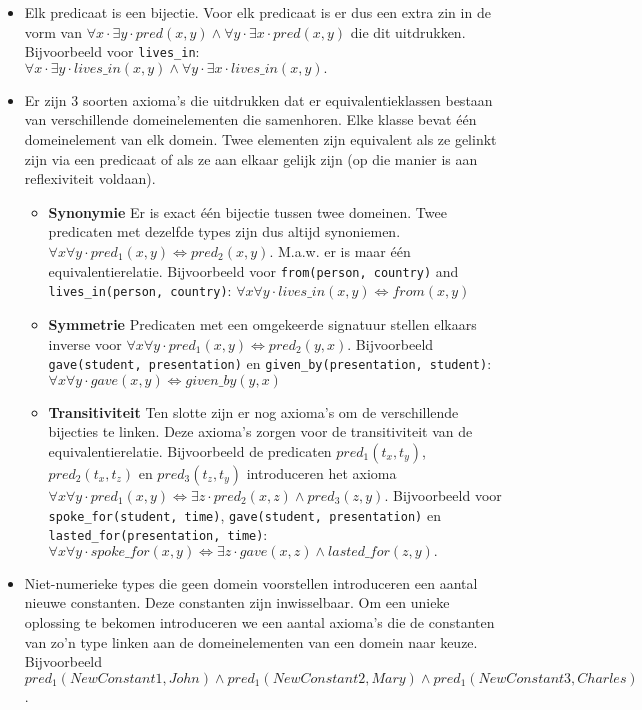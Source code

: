 \begin{itemize}
  \item Elk predicaat is een bijectie. Voor elk predicaat is er dus een extra zin in de vorm van $\forall x \cdot \exists y \cdot pred(x, y) \land \forall y \cdot \exists x \cdot pred(x, y)$ die dit uitdrukken. Bijvoorbeeld voor \texttt{lives\_in}: $\forall x \cdot \exists y \cdot lives\_in(x, y) \land \forall y \cdot \exists x \cdot lives\_in(x, y).$
  \item Er zijn 3 soorten axioma's die uitdrukken dat er equivalentieklassen bestaan van verschillende domeinelementen die samenhoren. Elke klasse bevat één domeinelement van elk domein. Twee elementen zijn equivalent als ze gelinkt zijn via een predicaat of als ze aan elkaar gelijk zijn (op die manier is aan reflexiviteit voldaan).
    \begin{itemize}
      \item \textbf{Synonymie} Er is exact één bijectie tussen twee domeinen. Twee predicaten met dezelfde types zijn dus altijd synoniemen. $\forall x \forall y \cdot pred_1(x, y) \Leftrightarrow pred_2(x, y)$. M.a.w. er is maar één equivalentierelatie. Bijvoorbeeld voor \texttt{from(person, country)} and \texttt{lives\_in(person, country)}: $\forall x \forall y \cdot lives\_in(x, y) \Leftrightarrow from(x, y)$
      \item \textbf{Symmetrie} Predicaten met een omgekeerde signatuur stellen elkaars inverse voor $\forall x \forall y \cdot pred_1(x, y) \Leftrightarrow pred_2(y, x)$. Bijvoorbeeld \texttt{gave(student, presentation)} en \texttt{given\_by(presentation, student)}: $\forall x \forall y \cdot gave(x, y) \Leftrightarrow given\_by(y, x)$
      \item \textbf{Transitiviteit} Ten slotte zijn er nog axioma's om de verschillende bijecties te linken. Deze axioma's zorgen voor de transitiviteit van de equivalentierelatie. Bijvoorbeeld de predicaten $pred_1(t_x, t_y)$, $pred_2(t_x, t_z)$ en $pred_3(t_z, t_y)$ introduceren het axioma $\forall x \forall y \cdot pred_1(x, y) \Leftrightarrow \exists z \cdot pred_2(x, z) \land pred_3(z, y)$. Bijvoorbeeld voor \texttt{spoke\_for(student, time)}, \texttt{gave(student, presentation)} en \texttt{lasted\_for(presentation, time)}: $\forall x \forall y \cdot spoke\_for(x, y) \Leftrightarrow \exists z \cdot gave(x, z) \land lasted\_for(z, y).$
    \end{itemize}
  \item Niet-numerieke types die geen domein voorstellen introduceren een aantal nieuwe constanten. Deze constanten zijn inwisselbaar. Om een unieke oplossing te bekomen introduceren we een aantal axioma's die de constanten van zo'n type linken aan de domeinelementen van een domein naar keuze. Bijvoorbeeld $pred_1(NewConstant1, John) \land pred_1(NewConstant2, Mary) \land pred_1(NewConstant3, Charles)$.
\end{itemize}

